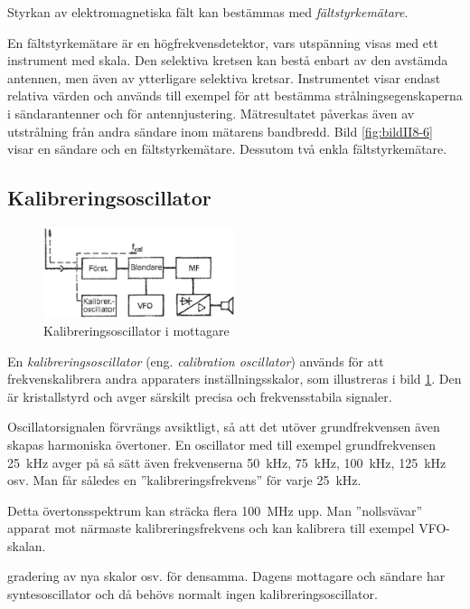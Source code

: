 Styrkan av elektromagnetiska fält kan bestämmas med \emph{fältstyrkemätare}.

En fältstyrkemätare är en högfrekvensdetektor, vars utspänning visas med ett
instrument med skala.
Den selektiva kretsen kan bestå enbart av den avstämda antennen, men även av
ytterligare selektiva kretsar.
Instrumentet visar endast relativa värden och används till exempel för att bestämma
strålningsegenskaperna i sändarantenner och för antennjustering.
Mätresultatet påverkas även av utstrålning från andra sändare inom mätarens
bandbredd.
Bild \ref{fig:bildII8-6} visar en sändare och en fältstyrkemätare.
Dessutom två enkla fältstyrkemätare.

\subsection{Kalibreringsoscillator}

\begin{figure}
  \includegraphics[width=0.5\textwidth]{images/cropped_pdfs/bild_2_8-07.pdf}
  \caption{Kalibreringsoscillator i mottagare}
  \label{fig:bildII8-7}
\end{figure}

En \emph{kalibreringsoscillator} (eng. \emph{calibration oscillator}) används
för att frekvenskalibrera andra apparaters inställningsskalor, som illustreras
i bild \ref{fig:bildII8-7}.
Den är kristallstyrd och avger särskilt precisa och frekvensstabila signaler.

Oscillatorsignalen förvrängs avsiktligt, så att det utöver grundfrekvensen även
skapas harmoniska övertoner.
En oscillator med till exempel grundfrekvensen 25~kHz avger på så sätt även
frekvenserna 50~kHz, 75~kHz, 100~kHz, 125~kHz osv.
Man får således en ''kalibreringsfrekvens'' för varje 25~kHz.

Detta övertonsspektrum kan sträcka flera 100~MHz upp.
Man ''nollsvävar'' apparat mot närmaste kalibreringsfrekvens och kan
kalibrera till exempel VFO-skalan.


gradering av nya skalor osv. för densamma.
Dagens mottagare och sändare har syntesoscillator och då behövs normalt ingen
kalibreringsoscillator.

